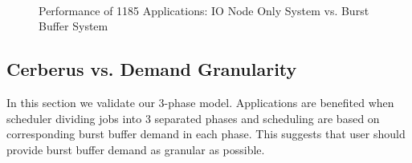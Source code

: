 \begin{figure}[!t]
        \centering
        ~
        \caption{Performance of 1185 Applications: IO Node Only System vs. Burst Buffer System}
        \label{Fig:DirectIOPerformance}
\end{figure}


\subsection{Cerberus vs. Demand Granularity}
In this section we validate our 3-phase model.
Applications are benefited when scheduler dividing jobs into 3 separated phases and 
scheduling are based on corresponding burst buffer demand in each phase.
This suggests that user should provide burst buffer demand as granular as possible.

